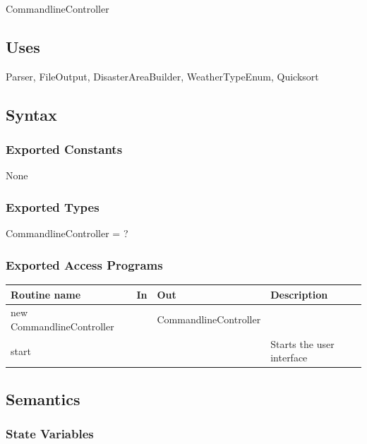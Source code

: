 \documentclass[12pt]{article}
\begin{document}
                CommandlineController
                
                \subsection* {Uses}
                
                Parser, FileOutput, DisasterAreaBuilder, WeatherTypeEnum, Quicksort
                
                \subsection* {Syntax}
                \subsubsection * {Exported Constants}
                
                None
                
                \subsubsection* {Exported Types}
            
                CommandlineController = ?
                
                \subsubsection* {Exported Access Programs}
            
                \begin{tabular}{| l | l | l | p{5cm} |}
                \hline
                \textbf{Routine name} & \textbf{In} & \textbf{Out} & \textbf{Description}\\
                \hline
                new CommandlineController &  & CommandlineController & ~\\
                \hline 
                start & ~ & ~ & Starts the user interface\\
                \hline 
                \end{tabular}
                
                \subsection* {Semantics}
                
                \subsubsection *{State Variables} 
                
\end{document}

